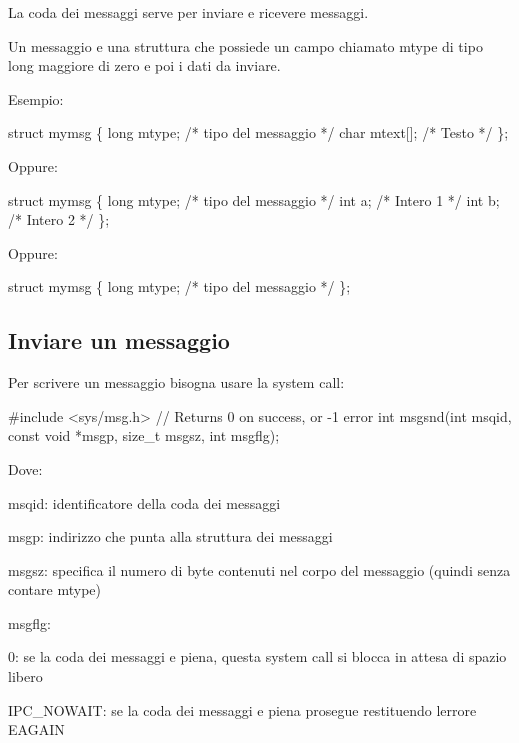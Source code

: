 La coda dei messaggi serve per inviare e ricevere messaggi.

Un messaggio e\textquotesingle{} una struttura che possiede un campo chiamato mtype di tipo long maggiore di zero e poi i dati da inviare.

Esempio\+: 
\begin{DoxyCode}
\textcolor{keyword}{struct }mymsg \{
    \textcolor{keywordtype}{long} mtype;   \textcolor{comment}{/* tipo del messaggio */}
    \textcolor{keywordtype}{char} mtext[]; \textcolor{comment}{/* Testo */}
\};
\end{DoxyCode}


Oppure\+: 
\begin{DoxyCode}
\textcolor{keyword}{struct }mymsg \{
    \textcolor{keywordtype}{long} mtype;   \textcolor{comment}{/* tipo del messaggio */}
    \textcolor{keywordtype}{int} a;        \textcolor{comment}{/* Intero 1 */}
    \textcolor{keywordtype}{int} b;        \textcolor{comment}{/* Intero 2 */}
\};
\end{DoxyCode}


Oppure\+: 
\begin{DoxyCode}
\textcolor{keyword}{struct }mymsg \{
    \textcolor{keywordtype}{long} mtype;   \textcolor{comment}{/* tipo del messaggio */}
\};
\end{DoxyCode}


\subsection*{Inviare un messaggio}

Per scrivere un messaggio bisogna usare la system call\+: 
\begin{DoxyCode}
\textcolor{preprocessor}{#include <sys/msg.h>}
\textcolor{comment}{// Returns 0 on success, or -1 error}
\textcolor{keywordtype}{int} msgsnd(\textcolor{keywordtype}{int} msqid, \textcolor{keyword}{const} \textcolor{keywordtype}{void} *msgp, \textcolor{keywordtype}{size\_t} msgsz, \textcolor{keywordtype}{int} msgflg);
\end{DoxyCode}


Dove\+:
\begin{DoxyItemize}
\item {\ttfamily msqid}\+: identificatore della coda dei messaggi
\item {\ttfamily msgp}\+: indirizzo che punta alla struttura dei messaggi
\item {\ttfamily msgsz}\+: specifica il numero di byte contenuti nel corpo del messaggio (quindi senza contare mtype)
\item {\ttfamily msgflg}\+:
\begin{DoxyItemize}
\item 0\+: se la coda dei messaggi e\textquotesingle{} piena, questa system call si blocca in attesa di spazio libero
\item {\ttfamily I\+P\+C\+\_\+\+N\+O\+W\+A\+IT}\+: se la coda dei messaggi e\textquotesingle{} piena prosegue restituendo l\textquotesingle{}errore E\+A\+G\+A\+IN
\end{DoxyItemize}
\end{DoxyItemize}

